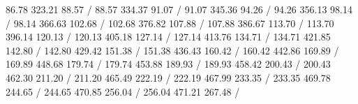 { 86.78 323.21 88.57 /
 88.57 334.37 91.07 /
 91.07 345.36 94.26 /
 94.26 356.13 98.14 /
 98.14 366.63 102.68 /
 102.68 376.82 107.88 /
 107.88 386.67 113.70 /
 113.70 396.14 120.13 /
 120.13 405.18 127.14 /
 127.14 413.76 134.71 /
 134.71 421.85 142.80 /
 142.80 429.42 151.38 /
 151.38 436.43 160.42 /
 160.42 442.86 169.89 /
 169.89 448.68 179.74 /
 179.74 453.88 189.93 /
 189.93 458.42 200.43 /
 200.43 462.30 211.20 /
 211.20 465.49 222.19 /
 222.19 467.99 233.35 /
 233.35 469.78 244.65 /
 244.65 470.85 256.04 /
 256.04 471.21 267.48 /
\endpicture
}


